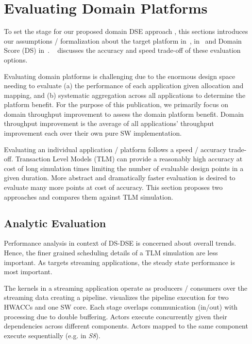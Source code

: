 \section{Evaluating Domain Platforms}
\label{sec:EvaOp}

To set the stage for our proposed domain DSE approach ,
this sections introduces our assumptions / formalization about the
target platform in~,  in~ and Domain Score (DS) in~. ~ discusses the accuracy and speed trade-off of these evaluation options.

Evaluating domain platforms is challenging due to the enormous design space needing to evaluate (a) the performance of each application given allocation and mapping, and (b) systematic aggregation across all applications to determine the platform benefit. 
For the purpose of this publication, we primarily focus on domain throughput improvement to assess the domain platform benefit. Domain throughput improvement is the average of all applications' throughput improvement each over their own pure SW implementation. 

Evaluating an individual application / platform follows a speed / accuracy trade-off. Transaction Level Models (TLM) can provide a reasonably high accuracy at cost of long simulation times limiting the number of evaluable design points in a given duration. More abstract and dramatically faster evaluation is desired to evaluate many more points at cost of accuracy. 
This section proposes two approaches and compares them against TLM simulation.




\subsection{Analytic Evaluation}
\label{sec:Ana}

Performance analysis in context of DS-DSE is concerned about overall trends. Hence, the finer grained scheduling details of a TLM simulation are less important. As \ga targets streaming applications, the steady state performance is most important. 

The kernels in a streaming application operate as producers / consumers over the streaming data creating a pipeline.  visualizes the pipeline execution for two HWACCs and one SW core. Each stage overlaps communication (in/out) with processing due to double buffering. Actors execute concurrently given their dependencies across different components. Actors mapped to the same component execute sequentially (e.g. in \emph{S8}).

